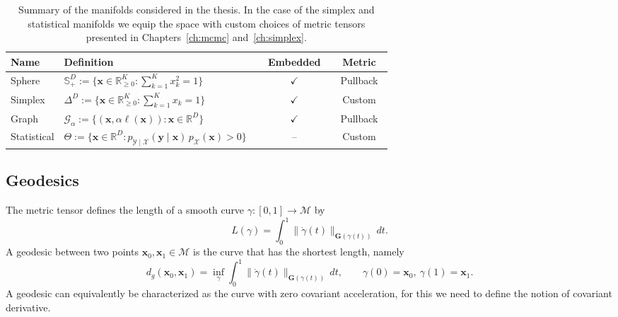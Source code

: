 \begin{table}[t]
\centering
\footnotesize
\renewcommand{\arraystretch}{1.2}
\begin{tabular}{@{}p{0.14\linewidth}p{0.52\linewidth}cc@{}}
\toprule
\textbf{Name} & \textbf{Definition} & \textbf{Embedded} & \textbf{Metric} \\
\midrule
Sphere &
$\mathbb{S}_{+}^{D}:=\{\boldsymbol{x}\in\mathbb{R}_{\ge 0}^{K}:\sum_{k=1}^{K} x_k^2 = 1\}$ &
$\checkmark$ &
Pullback \\
Simplex &
$\Delta^{D}:=\{\boldsymbol{x}\in\mathbb{R}_{\ge 0}^{K}:\sum_{k=1}^{K}x_k=1\}$ &
$\checkmark$ &
Custom \\
Graph &
$\mathcal{G}_{\alpha}:=\{(\boldsymbol{x},\alpha \ell(\boldsymbol{x})):\boldsymbol{x}\in\mathbb{R}^{D}\}$ &
$\checkmark$ &
Pullback \\
Statistical &
$\Theta:=\{\boldsymbol{x}\in\mathbb{R}^{D}:p_{\mathcal{Y}\mid\mathcal{X}}(\boldsymbol{y}\mid\boldsymbol{x})\,p_{\mathcal{X}}(\boldsymbol{x})>0\}$ &
-- &
Custom \\
\bottomrule
\end{tabular}
\caption{Summary of the manifolds considered in the thesis. In the case of the simplex and statistical manifolds we equip the space with custom choices of metric tensors presented in Chapters~\ref{ch:mcmc} and~\ref{ch:simplex}. }
\label{tab:manifolds}
\end{table}

\subsection{Geodesics}
The metric tensor defines the length of a smooth curve $\gamma:[0,1]\to\mathcal{M}$ by 
\begin{equation}
L(\gamma)
=
\int_0^1 \|\dot\gamma(t)\|_{\mathbf{G}(\gamma(t))}\,dt.
\end{equation}
A geodesic between two points $\boldsymbol{x}_0,\boldsymbol{x}_1\in\mathcal{M}$ is the curve that has the shortest length, namely
\begin{equation}
    d_g(\boldsymbol{x}_0,\boldsymbol{x}_1)
    =
    \inf_{\gamma}
    \int_0^1 \|\dot\gamma(t)\|_{\mathbf{G}(\gamma(t))}\,dt,
    \qquad
    \gamma(0)=\boldsymbol{x}_0,\ \gamma(1)=\boldsymbol{x}_1.
    \label{eq:geodesic_distance}
\end{equation}
A geodesic can equivalently be characterized as the curve with zero covariant acceleration, for this we need to define the notion of covariant derivative. 


